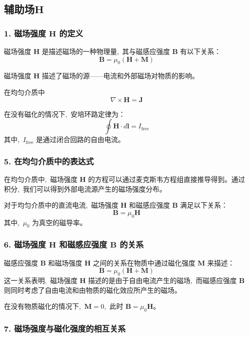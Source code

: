 \subsection{辅助场$\boldsymbol{H}$}

\subsubsection*{1. 磁场强度 \(\boldsymbol{H}\) 的定义}

磁场强度 \(\boldsymbol{H}\) 是描述磁场的一种物理量, \,其与磁感应强度 \(\boldsymbol{B}\) 有以下关系：
\[
\boldsymbol{B} = \mu_0 (\boldsymbol{H} + \boldsymbol{M})
\]

磁场强度 \(\boldsymbol{H}\) 描述了磁场的源——电流和外部磁场对物质的影响。

在均匀介质中
\[
\nabla \times \boldsymbol{H} = \boldsymbol{J}
\]

在没有磁化的情况下, \,安培环路定律为：
\[
\oint \boldsymbol{H} \cdot d\boldsymbol{l} = I_{\text{free}}
\]
其中, \,\(I_{\text{free}}\) 是通过闭合回路的自由电流。


\subsubsection*{5. 在均匀介质中的表达式}

在均匀介质中, \,磁场强度 \(\boldsymbol{H}\) 的方程可以通过麦克斯韦方程组直接推导得到。通过积分, \,我们可以得到外部电流源产生的磁场强度分布。

对于均匀介质中的直流电流, \,磁场强度 \(\boldsymbol{H}\) 和磁感应强度 \(\boldsymbol{B}\) 满足以下关系：
\[
\boldsymbol{B} = \mu_0 \boldsymbol{H}
\]
其中, \,\(\mu_0\) 为真空的磁导率。

\subsubsection*{6. 磁场强度 \(\boldsymbol{H}\) 和磁感应强度 \(\boldsymbol{B}\) 的关系}

磁感应强度 \(\boldsymbol{B}\) 和磁场强度 \(\boldsymbol{H}\) 之间的关系在物质中通过磁化强度 \(\boldsymbol{M}\) 来描述：
\[
\boldsymbol{B} = \mu_0 (\boldsymbol{H} + \boldsymbol{M})
\]
这一关系表明, \,磁场强度 \(\boldsymbol{H}\) 描述的是由于自由电流产生的磁场, \,而磁感应强度 \(\boldsymbol{B}\) 则同时考虑了自由电流和由物质的磁化效应所产生的磁场。

在没有物质磁化的情况下, \,\(\boldsymbol{M} = 0\), \,此时 \(\boldsymbol{B} = \mu_0 \boldsymbol{H}\)。

\subsubsection*{7. 磁场强度与磁化强度的相互关系}

